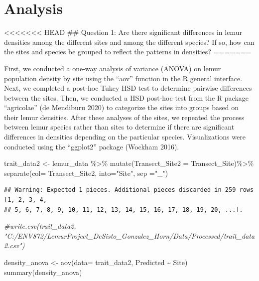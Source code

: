 \documentclass[
  12pt,
]{article}
\newenvironment{Shaded}{\begin{snugshade}}{\end{snugshade}}
\newcommand{\AttributeTok}[1]{\textcolor[rgb]{0.77,0.63,0.00}{#1}}
\newcommand{\CommentTok}[1]{\textcolor[rgb]{0.56,0.35,0.01}{\textit{#1}}}
\newcommand{\FunctionTok}[1]{\textcolor[rgb]{0.00,0.00,0.00}{#1}}
\newcommand{\NormalTok}[1]{#1}
\newcommand{\OtherTok}[1]{\textcolor[rgb]{0.56,0.35,0.01}{#1}}
\newcommand{\SpecialCharTok}[1]{\textcolor[rgb]{0.00,0.00,0.00}{#1}}
\newcommand{\StringTok}[1]{\textcolor[rgb]{0.31,0.60,0.02}{#1}}
\begin{document}
\newpage

\hypertarget{analysis}{%
\section{Analysis}\label{analysis}}

\textless\textless\textless\textless\textless\textless\textless{} HEAD
\#\# Question 1: Are there significant differences in lemur densities
among the different sites and among the different species? If so, how
can the sites and species be grouped to reflect the patterns in
densities? =======

First, we conducted a one-way analysis of variance (ANOVA) on lemur
population density by site using the ``aov'' function in the R general
interface. Next, we completed a post-hoc Tukey HSD test to determine
pairwise differences between the sites. Then, we conducted a HSD
post-hoc test from the R package ``agricolae'' (de Mendiburu 2020) to
categorize the sites into groups based on their lemur densities. After
these analyses of the sites, we repeated the process between lemur
species rather than sites to determine if there are significant
differences in densities depending on the particular species.
Visualizations were conducted using the ``ggplot2'' package (Wockham
2016).

\begin{Shaded}
\begin{Highlighting}[]
\NormalTok{trait\_data2 }\OtherTok{\textless{}{-}}\NormalTok{ lemur\_data }\SpecialCharTok{\%\textgreater{}\%}
  \FunctionTok{mutate}\NormalTok{(}\AttributeTok{Transect\_Site2 =}\NormalTok{ Transect\_Site)}\SpecialCharTok{\%\textgreater{}\%}
  \FunctionTok{separate}\NormalTok{(}\AttributeTok{col=}\NormalTok{ Transect\_Site2, }\AttributeTok{into=}\StringTok{"Site"}\NormalTok{, }\AttributeTok{sep =}\StringTok{"\_"}\NormalTok{)}
\end{Highlighting}
\end{Shaded}

\begin{verbatim}
## Warning: Expected 1 pieces. Additional pieces discarded in 259 rows [1, 2, 3, 4,
## 5, 6, 7, 8, 9, 10, 11, 12, 13, 14, 15, 16, 17, 18, 19, 20, ...].
\end{verbatim}

\begin{Shaded}
\begin{Highlighting}[]
\CommentTok{\#write.csv(trait\_data2, "C:/ENV872/LemurProject\_DeSisto\_Gonzalez\_Horn/Data/Processed/trait\_data2.csv")}


\NormalTok{density\_anova }\OtherTok{\textless{}{-}} \FunctionTok{aov}\NormalTok{(}\AttributeTok{data=}\NormalTok{ trait\_data2, Predicted }\SpecialCharTok{\textasciitilde{}}\NormalTok{ Site)}
\FunctionTok{summary}\NormalTok{(density\_anova)}
\end{Highlighting}
\end{Shaded}
\end{document}
